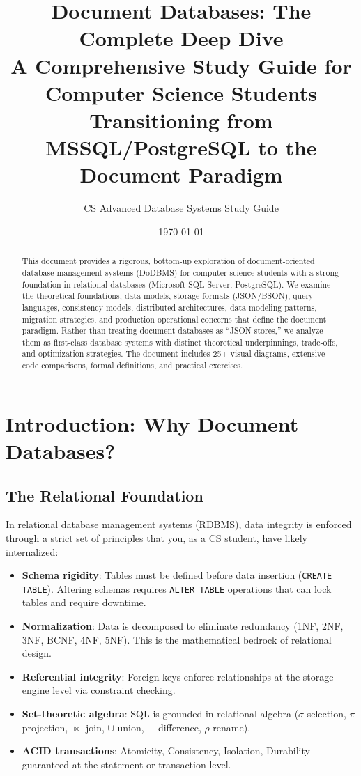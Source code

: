 \documentclass[12pt,a4paper]{article}
\title{\textbf{Document Databases: The Complete Deep Dive}\\\vspace{0.3cm}\large A Comprehensive Study Guide for Computer Science Students\\Transitioning from MSSQL/PostgreSQL to the Document Paradigm}
\author{CS Advanced Database Systems Study Guide}
\date{\today}
\begin{document}
\maketitle

\begin{abstract}
\noindent
This document provides a rigorous, bottom-up exploration of document-oriented database management systems (DoDBMS) for computer science students with a strong foundation in relational databases (Microsoft SQL Server, PostgreSQL). We examine the theoretical foundations, data models, storage formats (JSON/BSON), query languages, consistency models, distributed architectures, data modeling patterns, migration strategies, and production operational concerns that define the document paradigm. Rather than treating document databases as ``JSON stores,'' we analyze them as first-class database systems with distinct theoretical underpinnings, trade-offs, and optimization strategies. The document includes 25+ visual diagrams, extensive code comparisons, formal definitions, and practical exercises.
\end{abstract}

\tableofcontents
\newpage

\section{Introduction: Why Document Databases?}

\subsection{The Relational Foundation}

In relational database management systems (RDBMS), data integrity is enforced through a strict set of principles that you, as a CS student, have likely internalized:

\begin{itemize}[noitemsep]
    \item \textbf{Schema rigidity}: Tables must be defined before data insertion (\texttt{CREATE TABLE}). Altering schemas requires \texttt{ALTER TABLE} operations that can lock tables and require downtime.
    \item \textbf{Normalization}: Data is decomposed to eliminate redundancy (1NF, 2NF, 3NF, BCNF, 4NF, 5NF). This is the mathematical bedrock of relational design.
    \item \textbf{Referential integrity}: Foreign keys enforce relationships at the storage engine level via constraint checking.
    \item \textbf{Set-theoretic algebra}: SQL is grounded in relational algebra ($\sigma$ selection, $\pi$ projection, $\bowtie$ join, $\cup$ union, $-$ difference, $\rho$ rename).
    \item \textbf{ACID transactions}: Atomicity, Consistency, Isolation, Durability guaranteed at the statement or transaction level.
\end{itemize}
\end{document}
